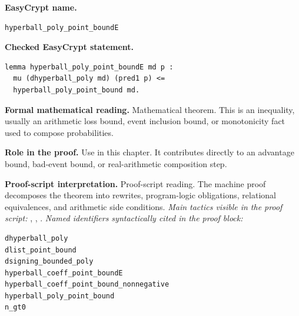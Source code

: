 \begin{formaltheorem}
\noindent\textbf{EasyCrypt name.}
\begin{lstlisting}[language=EasyCrypt,basicstyle=\ttfamily\scriptsize]
hyperball_poly_point_boundE
\end{lstlisting}
\noindent\textbf{Checked EasyCrypt statement.}
\begin{lstlisting}[language=EasyCrypt,basicstyle=\ttfamily\scriptsize]
lemma hyperball_poly_point_boundE md p :
  mu (dhyperball_poly md) (pred1 p) <=
  hyperball_poly_point_bound md.
\end{lstlisting}
\noindent\textbf{Formal mathematical reading.}
Mathematical theorem. This is an inequality, usually an arithmetic loss bound, event inclusion bound, or monotonicity fact used to compose probabilities.

\noindent\textbf{Role in the proof.}
Use in this chapter. It contributes directly to an advantage bound, bad-event bound, or real-arithmetic composition step.

\noindent\textbf{Proof-script interpretation.}
Proof-script reading. The machine proof decomposes the theorem into rewrites, program-logic obligations, relational equivalences, and arithmetic side conditions.
\emph{Main tactics visible in the proof script:} , , .
\emph{Named identifiers syntactically cited in the proof block:}
\begin{lstlisting}[language=EasyCrypt,basicstyle=\ttfamily\scriptsize]
dhyperball_poly
dlist_point_bound
dsigning_bounded_poly
hyperball_coeff_point_boundE
hyperball_coeff_point_bound_nonnegative
hyperball_poly_point_bound
n_gt0
\end{lstlisting}

\end{formaltheorem}

